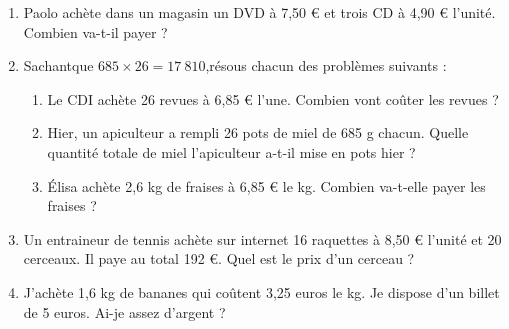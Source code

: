 \exo{}

\begin{enumerate}[itemsep=2em]
	\item Paolo achète dans un magasin un DVD à 7,50 € et trois CD à 4,90 € l'unité. Combien va-t-il payer ?

	\item Sachantque $685\times26=17~810$,résous chacun des problèmes suivants :
	\begin{enumerate}[itemsep=1em]
		\item Le CDI achète 26 revues à 6,85 € l'une. Combien vont coûter les revues ?
		\item Hier, un apiculteur a rempli 26 pots de miel de 685 g chacun. Quelle quantité totale de miel l'apiculteur a-t-il mise en pots hier ?
		\item Élisa achète 2,6 kg de fraises à 6,85 € le kg. Combien va-t-elle payer les fraises ?
	\end{enumerate}

	\item Un entraineur de tennis achète sur internet 16 raquettes à 8,50 € l’unité et 20 cerceaux. Il paye au total 192 €. Quel est le prix d'un cerceau ?
	
	\item J'achète 1,6 kg de bananes qui coûtent 3,25 euros le kg. Je dispose d’un billet de 5 euros. Ai-je assez d'argent ?
	
\end{enumerate}